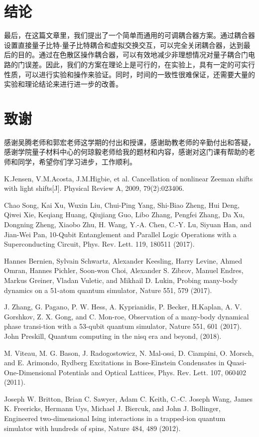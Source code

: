 \documentclass[11pt,twocolumn]{ctexart}
\begin{document}
\section{结论}

最后，在这篇文章里，我们提出了一个简单而通用的可调耦合器方案。通过耦合器设置直接量子比特-量子比特耦合和虚拟交换交互，可以完全关闭耦合器，达到最后的目的。通过在色散区操作耦合器，可以有效地减少非理想情况对量子耦合门电路的门误差。因此，我们的方案在理论上是可行的，在实验上，具有一定的可实行性质，可以进行实验和操作来验证。同时，时间的一致性很难保证，还需要大量的实验和理论结论来进行进一步的改善。


\section{致谢}
感谢吴腾老师和郭宏老师这学期的付出和授课，感谢助教老师的辛勤付出和答疑，感谢学院量子材料中心的何琼毅老师给我的题材和内容，感谢对这门课有帮助的老师和同学，希望你们学习进步，工作顺利。


\begin{thebibliography}{1}
 K.Jensen, V.M.Acosta, J.M.Higbie, et al. Cancellation of nonlinear Zeeman shifts with light shifts[J]. Physical Review A, 2009, 79(2):023406.

 Chao Song, Kai Xu, Wuxin Liu, Chui-Ping Yang, Shi-Biao Zheng, Hui Deng, Qiwei Xie, Keqiang Huang, Qiujiang Guo, Libo Zhang, Pengfei Zhang, Da Xu, Dongning Zheng, Xiaobo Zhu, H. Wang, Y.-A. Chen, C.-Y. Lu, Siyuan Han, and Jian-Wei Pan, 10-Qubit Entanglement and Parallel Logic Operations with a Superconducting Circuit, Phys. Rev. Lett. 119, 180511 (2017).

 Hannes Bernien, Sylvain Schwartz, Alexander Keesling, Harry Levine, Ahmed Omran, Hannes Pichler, Soon-won Choi, Alexander S. Zibrov, Manuel Endres, Markus Greiner, Vladan Vuletic, and Mikhail D. Lukin, Probing many-body dynamics on a 51-atom quantum simulator, Nature 551, 579 (2017).

 J. Zhang, G. Pagano, P. W. Hess, A. Kyprianidis, P. Becker, H.Kaplan, A. V. Gorshkov, Z. X. Gong, and C. Mon-roe, Observation of a many-body dynamical phase transi-tion with a 53-qubit quantum simulator, Nature 551, 601 (2017).
John Preskill, Quantum computing in the nisq era and beyond, (2018).

 M. Viteau, M. G. Bason, J. Radogostowicz, N. Mal-ossi, D. Ciampini, O. Morsch, and E. Arimondo, Rydberg Excitations in Bose-Einstein Condensates in Quasi-One-Dimensional Potentials and Optical Lattices, Phys. Rev. Lett. 107, 060402 (2011).

 Joseph W. Britton, Brian C. Sawyer, Adam C. Keith, C.-C. Joseph Wang, James K. Freericks, Hermann Uys, Michael J. Biercuk, and John J. Bollinger, Engineered two-dimensional Ising interactions in a trapped-ion quantum simulator with hundreds of spins, Nature 484, 489 (2012).


\end{thebibliography}
\end{document}
